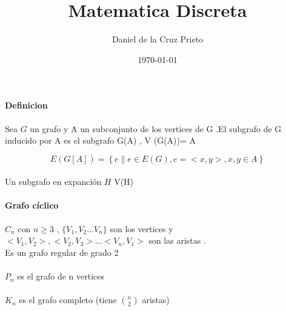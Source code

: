 \documentclass{article}
\begin{document}
	\title{Matematica Discreta }
	\author{Daniel de la Cruz Prieto}
	\date{\today} 
	
	\maketitle
	
	\paragraph{Definicion}
		Sea $G$ un grafo y A un subconjunto de los vertices de G .El subgrafo de G inducido por A es el subgrafo G(A) , V (G(A))= A 
	
	\begin{equation*}
		\displaystyle E\left(G\left[ A\right]\right)= \left\{e\|e \in E(G), e = <x,y> , x,y \in A\right\}
	\end{equation*}
	
	
	\paragraph{}
	Un subgrafo en expanci\'on $H$ V(H) 
	
	\paragraph{Grafo c\'iclico }
	$C_n$ con $n\geq3$ , $\{V_1,V_2\dots V_n\}$ son los vertices  y $<V_1,V_2>  , <V_2,V_3> \dots <V_n,V_1>$ son las aristas . \\
	Es un grafo regular de grado 2 
	
	\paragraph{} $P_n$ es el grafo de n vertices 
	
	\paragraph{} $K_n$ es el grafo completo (tiene ${n \choose 2 }$ aristas)  
	
\end{document}
